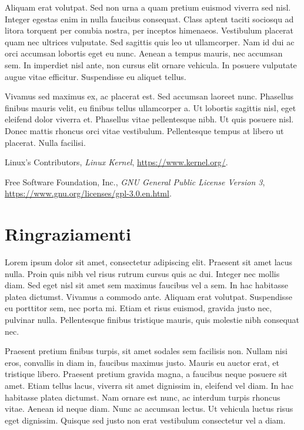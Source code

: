 \documentclass[12pt,a4paper,openright,twoside]{report}
\begin{document}
Aliquam erat volutpat. Sed non urna a quam pretium euismod viverra sed nisl. Integer egestas enim in nulla faucibus consequat. Class aptent taciti sociosqu ad litora torquent per conubia nostra, per inceptos himenaeos. Vestibulum placerat quam nec ultrices vulputate. Sed sagittis quis leo ut ullamcorper. Nam id dui ac orci accumsan lobortis eget eu nunc. Aenean a tempus mauris, nec accumsan sem. In imperdiet nisl ante, non cursus elit ornare vehicula. In posuere vulputate augue vitae efficitur. Suspendisse eu aliquet tellus.

Vivamus sed maximus ex, ac placerat est. Sed accumsan laoreet nunc. Phasellus finibus mauris velit, eu finibus tellus ullamcorper a. Ut lobortis sagittis nisl, eget eleifend dolor viverra et. Phasellus vitae pellentesque nibh. Ut quis posuere nisl. Donec mattis rhoncus orci vitae vestibulum. Pellentesque tempus at libero ut placerat. Nulla facilisi.

\begin{thebibliography}{99}
	Linux's Contributors,
	\textit{Linux Kernel},
	\url{https://www.kernel.org/}.

	Free Software Foundation, Inc.,
	\textit{GNU General Public License Version 3},
	\url{https://www.gnu.org/licenses/gpl-3.0.en.html}.

\end{thebibliography}

\chapter*{Ringraziamenti}
Lorem ipsum dolor sit amet, consectetur adipiscing elit. Praesent sit amet lacus nulla. Proin quis nibh vel risus rutrum cursus quis ac dui. Integer nec mollis diam. Sed eget nisl sit amet sem maximus faucibus vel a sem. In hac habitasse platea dictumst. Vivamus a commodo ante. Aliquam erat volutpat. Suspendisse eu porttitor sem, nec porta mi. Etiam et risus euismod, gravida justo nec, pulvinar nulla. Pellentesque finibus tristique mauris, quis molestie nibh consequat nec.

Praesent pretium finibus turpis, sit amet sodales sem facilisis non. Nullam nisi eros, convallis in diam in, faucibus maximus justo. Mauris eu auctor erat, et tristique libero. Praesent pretium gravida magna, a faucibus neque posuere sit amet. Etiam tellus lacus, viverra sit amet dignissim in, eleifend vel diam. In hac habitasse platea dictumst. Nam ornare est nunc, ac interdum turpis rhoncus vitae. Aenean id neque diam. Nunc ac accumsan lectus. Ut vehicula luctus risus eget dignissim. Quisque sed justo non erat vestibulum consectetur vel a diam.
\end{document}
